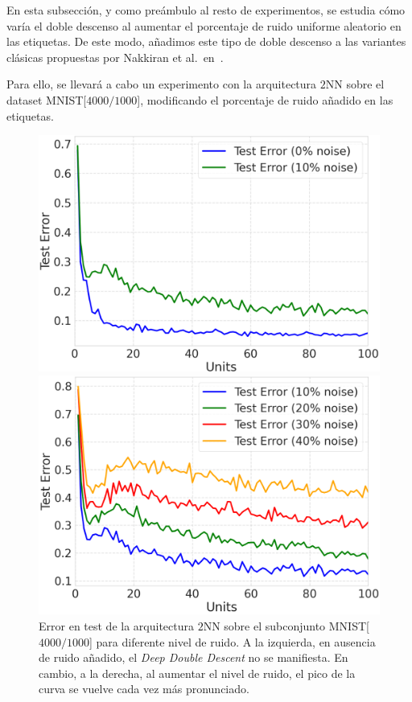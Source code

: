 En esta subsección, y como preámbulo al resto de experimentos, se estudia cómo varía el doble descenso al aumentar el porcentaje de ruido uniforme aleatorio en las etiquetas. De este modo, añadimos este tipo de doble descenso a las variantes clásicas propuestas por Nakkiran et al.\ en~\cite{Nakkiran2019}.

Para ello, se llevará a cabo un experimento con la arquitectura $2$NN sobre el dataset MNIST[$4000/1000$], modificando el porcentaje de ruido añadido en las etiquetas.

\begin{figure}[h]
    \centering
    \begin{minipage}{0.45\textwidth}
        \centering
        \includegraphics[width=\linewidth]{img/experiments/noise-wise-dd1.png}
    \end{minipage}
    \begin{minipage}{0.45\textwidth}
        \centering
        \includegraphics[width=\linewidth]{img/experiments/noise-wise-dd2.png}
    \end{minipage}
    \caption[\textit{Deep Double Descent} para distintos niveles de ruido.]{Error en test de la arquitectura $2$NN sobre el subconjunto MNIST[$4000/1000$] para diferente nivel de ruido. A la izquierda, en ausencia de ruido añadido, el \textit{Deep Double Descent} no se manifiesta. En cambio, a la derecha, al aumentar el nivel de ruido, el pico de la curva se vuelve cada vez más pronunciado.}\label{fig:noise-wise-dd}
\end{figure}

